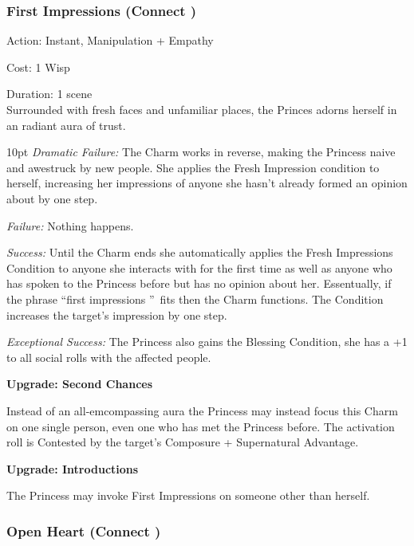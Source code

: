 \subsubsection*{First Impressions (Connect \textbullet)}

\noindent Action: Instant, Manipulation + Empathy

\noindent Cost: 1 Wisp

\noindent Duration: 1 scene \\

Surrounded with fresh faces and unfamiliar places, the Princes adorns herself in an radiant aura of trust. 

\begin{myindentpar}{10pt} \emph{Dramatic Failure:} The Charm works in reverse, making the Princess naive and awestruck by new people. She applies the Fresh Impression condition to herself, increasing her impressions of anyone she hasn't already formed an opinion about by one step. 

    \emph{Failure:} Nothing happens. 

    \emph{Success:} Until the Charm ends she automatically applies the Fresh Impressions Condition to anyone she interacts with for the first time as well as anyone who has spoken to the Princess before but has no opinion about her. Essentually, if the phrase \textquotedblleft first impressions \textquotedblright\, fits then the Charm functions. The Condition increases the target's impression by one step. 

    \emph{Exceptional Success:} The Princess also gains the Blessing Condition, she has a +1 to all social rolls with the affected people. 
    
    \textbf{Upgrade: Second Chances}

Instead of an all-emcompassing aura the Princess may instead focus this Charm on one single person, even one who has met the Princess before. The activation roll is Contested by the target's Composure + Supernatural Advantage. 

    \textbf{Upgrade: Introductions}
    
    The Princess may invoke First Impressions on someone other than herself. 

\end{myindentpar}

\subsubsection*{Open Heart (Connect \textbullet)}


